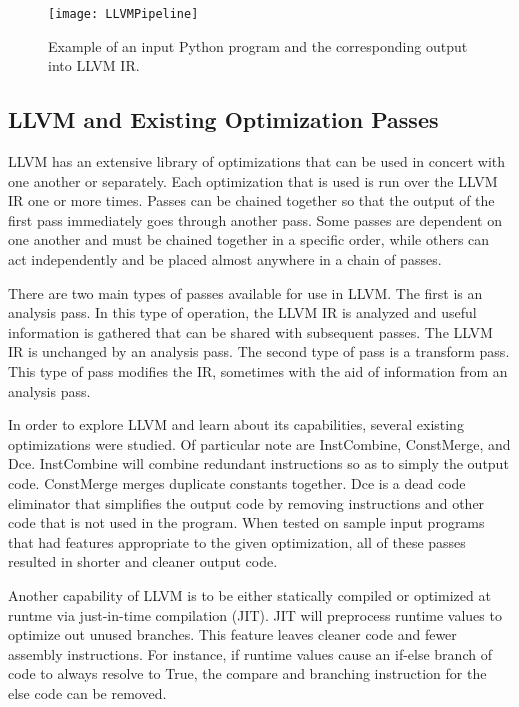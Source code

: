 \begin{figure}
\texttt{[image: LLVMPipeline]}
\caption{Example of an input Python program and the corresponding output into LLVM IR.}
\end{figure}

\subsection{LLVM and Existing Optimization Passes}

LLVM has an extensive library of optimizations that can be used in concert with one another or separately. Each optimization that is used is run over the LLVM IR one or more times. Passes can be chained together so that the output of the first pass immediately goes through another pass. Some passes are dependent on one another and must be chained together in a specific order, while others can act independently and be placed almost anywhere in a chain of passes. 

There are two main types of passes available for use in LLVM. The first is an analysis pass. In this type of operation, the LLVM IR is analyzed and useful information is gathered that can be shared with subsequent passes. The LLVM IR is unchanged by an analysis pass. The second type of pass is a transform pass. This type of pass modifies the IR, sometimes with the aid of information from an analysis pass.

In order to explore LLVM and learn about its capabilities, several existing optimizations were studied. Of particular note are InstCombine, ConstMerge, and Dce. InstCombine will combine redundant instructions so as to simply the output code. ConstMerge merges duplicate constants together. Dce is a dead code eliminator that simplifies the output code by removing instructions and other code that is not used in the program. When tested on sample input programs that had features appropriate to the given optimization, all of these passes resulted in shorter and cleaner output code.

Another capability of LLVM is to be either statically compiled or optimized at runtme via just-in-time compilation (JIT)\cite{Numba}. JIT will preprocess runtime values to optimize out unused branches.  This feature leaves cleaner code and fewer assembly instructions.  For instance, if runtime values cause an if-else branch of code to always resolve to True, the compare and branching instruction for the else code can be removed.


